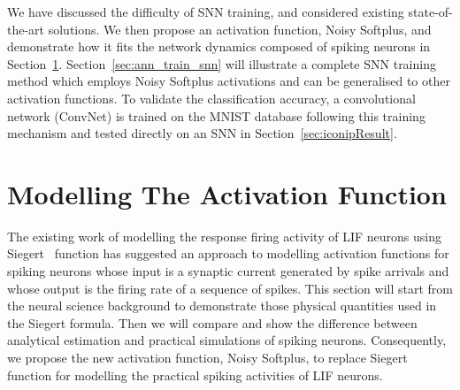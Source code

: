 \documentclass[runningheads,a4paper]{llncs}
\begin{document}
We have discussed the difficulty of SNN training, and considered existing state-of-the-art solutions.
We then propose an activation function, Noisy Softplus, and demonstrate how it fits the network dynamics composed of spiking neurons in Section~\ref{sec:af_model}.
Section~\ref{sec:ann_train_snn} will illustrate a complete SNN training method which employs Noisy Softplus activations and can be generalised to other activation functions.
To validate the classification accuracy, a convolutional network (ConvNet) is trained on the MNIST database following this training mechanism and tested directly on an SNN in Section~\ref{sec:iconipResult}.

\section{Modelling The Activation Function}
\label{sec:af_model}
The existing work of modelling the response firing activity of LIF neurons using Siegert~\cite{Jug_etal_2012} function has suggested an approach to modelling activation functions for spiking neurons whose input is a synaptic current generated by spike arrivals and whose output is the firing rate of a sequence of spikes.
This section will start from the neural science background to demonstrate those physical quantities used in the Siegert formula.
Then we will compare and show the difference between analytical estimation and practical simulations of spiking neurons.
Consequently, we propose the new activation function, Noisy Softplus, to replace Siegert function for modelling the practical spiking activities of LIF neurons.
\end{document}

